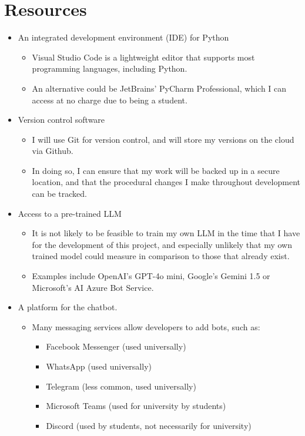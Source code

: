 \documentclass[12pt]{report}
\begin{document}
    \section{Resources}
    \begin{itemize}
        \item An integrated development environment (IDE) for Python
        \begin{itemize}
            \item Visual Studio Code is a lightweight editor that supports most programming languages,
            including Python.
            \item An alternative could be JetBrains' PyCharm Professional, which I can access at no charge due
            to being a student.
        \end{itemize}

        \item Version control software
        \begin{itemize}
            \item I will use Git for version control, and will store my versions on the cloud via Github. 
            \item In doing so, I can ensure that my work will be backed up in a secure location, and that the 
            procedural changes I make throughout development can be tracked.
        \end{itemize}

        \item Access to a pre-trained LLM
        \begin{itemize}
            \item It is not likely to be feasible to train my own LLM in the time that I have for the development 
            of this project, and especially unlikely that my own trained model could measure in comparison to those
            that already exist.
            \item Examples include OpenAI's GPT-4o mini, Google's Gemini 1.5  or Microsoft's AI Azure Bot Service.
        \end{itemize}

        \item A platform for the chatbot.
        \begin{itemize}
            \item Many messaging services allow developers to add bots, such as:
            \begin{itemize}
                \item Facebook Messenger (used universally)
                \item WhatsApp (used universally)
                \item Telegram (less common, used universally)
                \item Microsoft Teams (used for university by students)
                \item Discord (used by students, not necessarily for university)
            \end{itemize}
        \end{itemize}

    \end{itemize}
\end{document}
